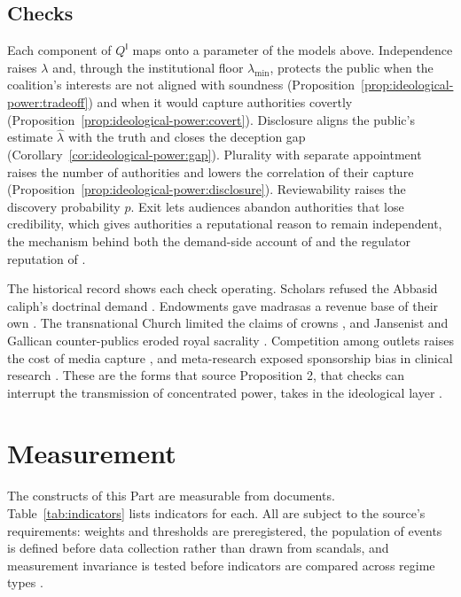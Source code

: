 \documentclass[11pt,letterpaper]{article}
\theoremstyle{definition}
\theoremstyle{remark}
\newcommand{\pI}{\mathsf{I}}
\begin{document}
\subsection{Checks}

Each component of $Q^{\pI}$ maps onto a parameter of the models above. Independence raises $\lambda$ and, through the institutional floor $\lambda_{\min}$, protects the public when the coalition's interests are not aligned with soundness (Proposition~\ref{prop:ideological-power:tradeoff}) and when it would capture authorities covertly (Proposition~\ref{prop:ideological-power:covert}). Disclosure aligns the public's estimate $\hat\lambda$ with the truth and closes the deception gap (Corollary~\ref{cor:ideological-power:gap}). Plurality with separate appointment raises the number of authorities and lowers the correlation of their capture (Proposition~\ref{prop:ideological-power:disclosure}). Reviewability raises the discovery probability $p$. Exit lets audiences abandon authorities that lose credibility, which gives authorities a reputational reason to remain independent, the mechanism behind both the demand-side account of \citet{gentzkow2006} and the regulator reputation of \citet{carpenter2010}.

The historical record shows each check operating. Scholars refused the Abbasid caliph's doctrinal demand \citep{crone1986}. Endowments gave madrasas a revenue base of their own \citep{makdisi1981}. The transnational Church limited the claims of crowns \citep{grzymala2023}, and Jansenist and Gallican counter-publics eroded royal sacrality \citep{vankley1996}. Competition among outlets raises the cost of media capture \citep{besley2006}, and meta-research exposed sponsorship bias in clinical research \citep{lundh2017}. These are the forms that source Proposition 2, that checks can interrupt the transmission of concentrated power, takes in the ideological layer \citep{largo2026hbs}.

\section{Measurement}
\label{sec:measurement}

The constructs of this Part are measurable from documents. Table~\ref{tab:indicators} lists indicators for each. All are subject to the source's requirements: weights and thresholds are preregistered, the population of events is defined before data collection rather than drawn from scandals, and measurement invariance is tested before indicators are compared across regime types \citep{largo2026hbs}.
\end{document}
